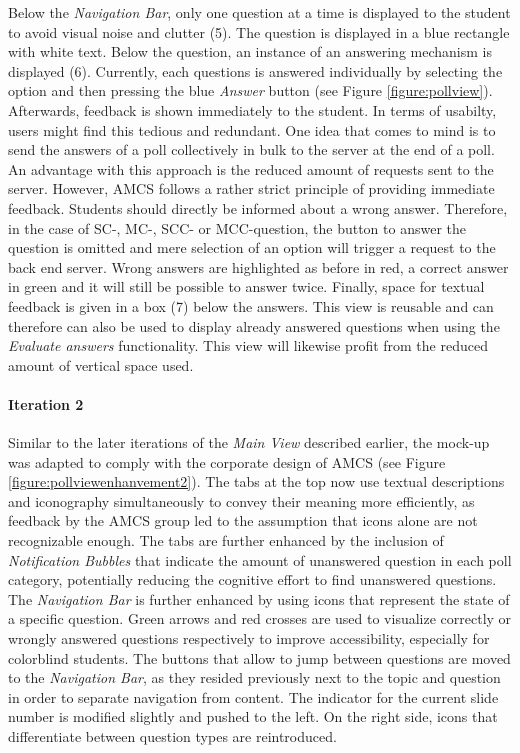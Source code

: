 \newline
\newline
Below the \emph{Navigation Bar}, only one question at a time is displayed to the student to avoid visual noise and clutter (5). The question is displayed in a blue rectangle with white text. Below the question, an instance of an answering mechanism is displayed (6). 
Currently, each questions is answered individually by selecting the option and then pressing the blue \emph{Answer} button (see Figure \ref{figure:pollview}). Afterwards, feedback is shown immediately to the student. In terms of usabilty, users might find this tedious and redundant. One idea that comes to mind is to send the answers of a poll collectively in bulk to the server at the end of a poll. An advantage with this approach is the reduced amount of requests sent to the server. However, AMCS follows a rather strict principle of providing immediate feedback. Students should directly be informed about a wrong answer.
Therefore, in the case of SC-, MC-, SCC- or MCC-question, the button to answer the question is omitted and mere selection of an option will trigger a request to the back end server.
Wrong answers are highlighted as before in red, a correct answer in green and it will still be possible to answer twice. Finally, space for textual feedback is given in a box (7) below the answers. This view is reusable and can therefore can also be used to display already answered questions when using the \emph{Evaluate answers} functionality. This view will likewise profit from the reduced amount of vertical space used. 

\paragraph{Iteration 2}
Similar to the later iterations of the \emph{Main View} described earlier, the mock-up was adapted to comply with the corporate design of AMCS (see Figure \ref{figure:pollviewenhanvement2}).
The tabs at the top now use textual descriptions and iconography simultaneously to convey their meaning more efficiently, as feedback by the AMCS group led to the assumption that icons alone are not recognizable enough. The tabs are further enhanced by the inclusion of \emph{Notification Bubbles} that indicate the amount of unanswered question in each poll category, potentially reducing the cognitive effort to find unanswered questions.
The \emph{Navigation Bar} is further enhanced by using icons that represent the state of a specific question. Green arrows and red crosses are used to visualize correctly or wrongly answered questions respectively to improve accessibility, especially for colorblind students.
The buttons that allow to jump between questions are moved to the \emph{Navigation Bar}, as they resided previously next to the topic and question in order to separate navigation from content.
The indicator for the current slide number is modified slightly and pushed to the left. On the right side, icons that differentiate between question types are reintroduced. 
